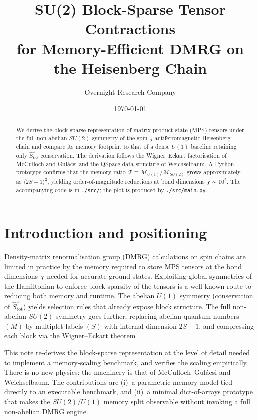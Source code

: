 \documentclass[11pt,a4paper]{article}
\title{SU(2) Block-Sparse Tensor Contractions \\ for Memory-Efficient DMRG on the Heisenberg Chain}
\author{Overnight Research Company}
\date{\today}
\newcommand{\mem}{\mathcal{M}}
\begin{document}
\maketitle

\begin{abstract}
We derive the block-sparse representation of matrix-product-state (MPS) tensors under the full non-abelian $SU(2)$ symmetry of the spin-$\tfrac12$ antiferromagnetic Heisenberg chain and compare its memory footprint to that of a dense $U(1)$ baseline retaining only $\hat S^z_{\mathrm{tot}}$ conservation. The derivation follows the Wigner--Eckart factorisation of McCulloch and Gul\'acsi and the QSpace data-structure of Weichselbaum. A Python prototype confirms that the memory ratio $\mathcal R \equiv \mem_{U(1)}/\mem_{SU(2)}$ grows approximately as $\langle 2S+1\rangle^{2}$, yielding order-of-magnitude reductions at bond dimensions $\chi \sim 10^{2}$. The accompanying code is in \texttt{./src/}; the plot is produced by \texttt{./src/main.py}.
\end{abstract}

\section{Introduction and positioning}

Density-matrix renormalisation group (DMRG) calculations on spin chains are limited in practice by the memory required to store MPS tensors at the bond dimensions $\chi$ needed for accurate ground states. Exploiting global symmetries of the Hamiltonian to enforce block-sparsity of the tensors is a well-known route to reducing both memory and runtime. The abelian $U(1)$ symmetry (conservation of $\hat S^z_{\mathrm{tot}}$) yields selection rules that already expose block structure. The full non-abelian $SU(2)$ symmetry goes further, replacing abelian quantum numbers $(M)$ by multiplet labels $(S)$ with internal dimension $2S+1$, and compressing each block via the Wigner--Eckart theorem~\cite{McCulloch2001,Weichselbaum2012}.

This note re-derives the block-sparse representation at the level of detail needed to implement a memory-scaling benchmark, and verifies the scaling empirically. There is no new physics: the machinery is that of McCulloch--Gul\'acsi and Weichselbaum. The contributions are (i)~a parametric memory model tied directly to an executable benchmark, and (ii)~a minimal dict-of-arrays prototype that makes the $SU(2)/U(1)$ memory split observable without invoking a full non-abelian DMRG engine.
\end{document}
